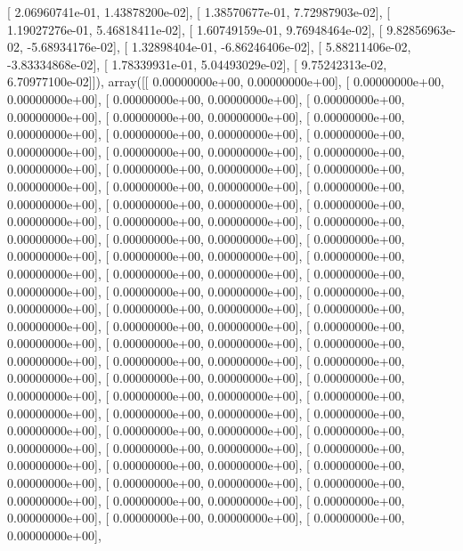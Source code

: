 \documentclass{article}
\begin{document}
       [ 2.06960741e-01,  1.43878200e-02],
       [ 1.38570677e-01,  7.72987903e-02],
       [ 1.19027276e-01,  5.46818411e-02],
       [ 1.60749159e-01,  9.76948464e-02],
       [ 9.82856963e-02, -5.68934176e-02],
       [ 1.32898404e-01, -6.86246406e-02],
       [ 5.88211406e-02, -3.83334868e-02],
       [ 1.78339931e-01,  5.04493029e-02],
       [ 9.75242313e-02,  6.70977100e-02]]), array([[ 0.00000000e+00,  0.00000000e+00],
       [ 0.00000000e+00,  0.00000000e+00],
       [ 0.00000000e+00,  0.00000000e+00],
       [ 0.00000000e+00,  0.00000000e+00],
       [ 0.00000000e+00,  0.00000000e+00],
       [ 0.00000000e+00,  0.00000000e+00],
       [ 0.00000000e+00,  0.00000000e+00],
       [ 0.00000000e+00,  0.00000000e+00],
       [ 0.00000000e+00,  0.00000000e+00],
       [ 0.00000000e+00,  0.00000000e+00],
       [ 0.00000000e+00,  0.00000000e+00],
       [ 0.00000000e+00,  0.00000000e+00],
       [ 0.00000000e+00,  0.00000000e+00],
       [ 0.00000000e+00,  0.00000000e+00],
       [ 0.00000000e+00,  0.00000000e+00],
       [ 0.00000000e+00,  0.00000000e+00],
       [ 0.00000000e+00,  0.00000000e+00],
       [ 0.00000000e+00,  0.00000000e+00],
       [ 0.00000000e+00,  0.00000000e+00],
       [ 0.00000000e+00,  0.00000000e+00],
       [ 0.00000000e+00,  0.00000000e+00],
       [ 0.00000000e+00,  0.00000000e+00],
       [ 0.00000000e+00,  0.00000000e+00],
       [ 0.00000000e+00,  0.00000000e+00],
       [ 0.00000000e+00,  0.00000000e+00],
       [ 0.00000000e+00,  0.00000000e+00],
       [ 0.00000000e+00,  0.00000000e+00],
       [ 0.00000000e+00,  0.00000000e+00],
       [ 0.00000000e+00,  0.00000000e+00],
       [ 0.00000000e+00,  0.00000000e+00],
       [ 0.00000000e+00,  0.00000000e+00],
       [ 0.00000000e+00,  0.00000000e+00],
       [ 0.00000000e+00,  0.00000000e+00],
       [ 0.00000000e+00,  0.00000000e+00],
       [ 0.00000000e+00,  0.00000000e+00],
       [ 0.00000000e+00,  0.00000000e+00],
       [ 0.00000000e+00,  0.00000000e+00],
       [ 0.00000000e+00,  0.00000000e+00],
       [ 0.00000000e+00,  0.00000000e+00],
       [ 0.00000000e+00,  0.00000000e+00],
       [ 0.00000000e+00,  0.00000000e+00],
       [ 0.00000000e+00,  0.00000000e+00],
       [ 0.00000000e+00,  0.00000000e+00],
       [ 0.00000000e+00,  0.00000000e+00],
       [ 0.00000000e+00,  0.00000000e+00],
       [ 0.00000000e+00,  0.00000000e+00],
       [ 0.00000000e+00,  0.00000000e+00],
       [ 0.00000000e+00,  0.00000000e+00],
       [ 0.00000000e+00,  0.00000000e+00],
       [ 0.00000000e+00,  0.00000000e+00],
       [ 0.00000000e+00,  0.00000000e+00],
       [ 0.00000000e+00,  0.00000000e+00],
\end{document}
